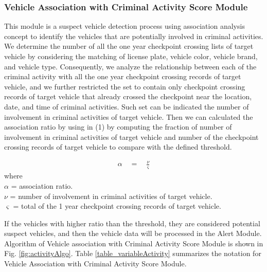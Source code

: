\subsubsection{Vehicle Association with Criminal Activity Score Module}
This module is a suspect vehicle detection process using association analysis concept to identify the vehicles that are potentially involved in criminal activities. 
We determine the number of all the one year checkpoint crossing lists of target vehicle by considering the matching of license plate, vehicle color, vehicle brand, and vehicle type. 
Consequently, we analyze the relationship between each of the criminal activity with all the one year checkpoint crossing records of target vehicle, and we further restricted the set to contain only checkpoint crossing records of target vehicle that already crossed the checkpoint near the location, date, and time of criminal activities. 
Such set can be indicated the number of involvement in criminal activities of target vehicle. 
Then we can calculated the association ratio by using in (1) by computing the fraction of number of involvement in criminal activities of target vehicle and number of the checkpoint crossing records of target vehicle to compare with the defined threshold.

\begin{eqnarray} 
\alpha \quad =\quad \frac { \nu  }{ \varsigma  }
\end{eqnarray}
where\mbox{ }\\
$\alpha$ = association ratio. \mbox{ }\\
$\nu$ = number of involvement in criminal activities of target vehicle.\mbox{ }\\
$\varsigma$ = total of the 1 year checkpoint crossing records of target vehicle.

If the vehicles with higher ratio than the threshold, they are considered potential suspect vehicles, and then the vehicle data will be processed in the Alert Module. 
Algorithm of Vehicle association with Criminal Activity Score Module is shown in Fig. \ref{fig:activityAlgo}. Table \ref{table_variableActivity} summarizes the notation for Vehicle Association with Criminal Activity Score Module.

